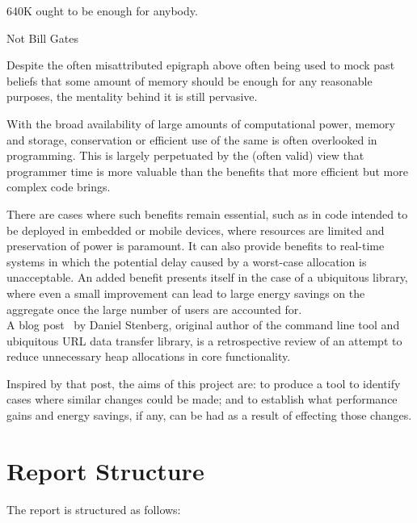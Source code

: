 \epigraph{640K ought to be enough for anybody.}{Not Bill Gates}

Despite the often misattributed epigraph above often being used to mock past beliefs that some amount of memory should be enough for any reasonable purposes, the mentality behind it is still pervasive.

With the broad availability of large amounts of computational power, memory and storage, conservation or efficient use of the same is often overlooked in programming. This is largely perpetuated by the (often valid) view that programmer time is more valuable than the benefits that more efficient but more complex code brings.

There are cases where such benefits remain essential, such as in code intended to be deployed in embedded or mobile devices, where resources are limited and preservation of power is paramount. It can also provide benefits to real-time systems in which the potential delay caused by a worst-case allocation is unacceptable. An added benefit presents itself in the case of a ubiquitous library, where even a small improvement can lead to large energy savings on the aggregate once the large number of users are accounted for.\\
A blog post~\cite{curlmalloc} by Daniel Stenberg, original author of the  command line tool and ubiquitous URL data transfer library, is a retrospective review of an attempt to reduce unnecessary heap allocations in core functionality.

Inspired by that post, the aims of this project are: to produce a tool to identify cases where similar changes could be made; and to establish what performance gains and energy savings, if any, can be had as a result of effecting those changes.

\section{Report Structure}

The report is structured as follows:


